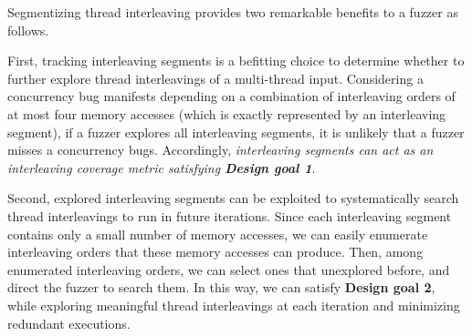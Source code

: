 





%
Segmentizing thread interleaving provides two remarkable benefits to a
fuzzer as follows.



First, tracking interleaving segments is a befitting choice to
determine whether to further explore thread interleavings of a
multi-thread input.
%
%
Considering a concurrency bug manifests depending on a combination of
interleaving orders of at most four memory accesses (which is exactly
represented by an interleaving segment), if a fuzzer explores all
interleaving segments, it is unlikely that a fuzzer misses a
concurrency bugs.
%
Accordingly, \textit{interleaving segments can act as an
  interleaving coverage metric satisfying \textbf{Design goal 1}}.






Second, explored interleaving segments can be exploited to
systematically search thread interleavings to run in future
iterations.
%
Since each interleaving segment contains only a small number of memory
accesses, we can easily enumerate interleaving orders that these
memory accesses can produce.
%
Then, among enumerated interleaving orders, we can select ones that
unexplored before, and direct the fuzzer to search them.
%
In this way, we can satisfy \textbf{Design goal 2}, while exploring
meaningful thread interleavings at each iteration and minimizing
redundant executions.


